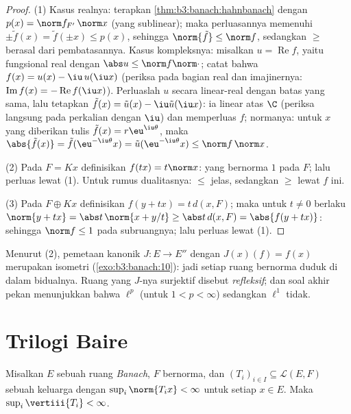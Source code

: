 \begin{proof}
(1) Kasus realnya: terapkan \cref{thm:b3:banach:hahnbanach} dengan $p(x)
= \norm f_{F'}\,\norm x$ (yang sublinear); maka perluasannya memenuhi
$\pm\tilde f(x) = \tilde f(\pm x) \leq p(x)$, sehingga
$\norm{\tilde f} \leq \norm f$, sedangkan $\geq$ berasal dari pembatasannya.
Kasus kompleksnya: misalkan $u = \operatorname{Re}f$, yaitu fungsional real
dengan $\abs u \leq \norm f\norm\cdot$; catat bahwa $f(x) = u(x) -
\iu\,u(\iu x)$ (periksa pada bagian real dan imajinernya:
$\operatorname{Im}f(x) = -\operatorname{Re}f(\iu x)$). Perluaslah
$u$ secara linear-real dengan batas yang sama, lalu tetapkan $\tilde f(x) =
\tilde u(x) - \iu\tilde u(\iu x)$: ia linear atas $\C$ (periksa langsung pada
perkalian dengan $\iu$) dan memperluas $f$; normanya: untuk $x$ yang diberikan
tulis $\tilde f(x) = r\eu^{\iu\theta}$, maka $\abs{\tilde f(x)}
= \tilde f(\eu^{-\iu\theta}x) = \tilde u(\eu^{-\iu\theta}x)
\leq \norm f\,\norm x$.

(2) Pada $F = Kx$ definisikan $f(tx) = t\norm x$: yang bernorma $1$ pada $F$;
lalu perluas lewat (1). Untuk rumus dualitasnya: $\leq$ jelas, sedangkan $\geq$ lewat
$f$ ini.

(3) Pada $F \oplus Kx$ definisikan $f(y + tx) = t\,d(x, F)$; maka untuk
$t \neq 0$ berlaku $\norm{y + tx} = \abs t\,\norm{x + y/t} \geq \abs
t\,d(x, F) = \abs{f(y + tx)}$: sehingga $\norm f \leq 1$ pada
subruangnya; lalu perluas lewat (1).
\end{proof}

\begin{remark}\label{rem:b3:banach:bidual}
Menurut (2), pemetaan kanonik $J \colon E \to E''$ dengan $J(x)(f) =
f(x)$ merupakan isometri (\cref{exo:b3:banach:10}): jadi setiap ruang
bernorma duduk di dalam bidualnya. Ruang yang $J$-nya surjektif
disebut \emph{refleksif}; dan soal akhir
pekan menunjukkan bahwa $\ell^p$ (untuk $1 < p < \infty$)  sedangkan
$\ell^1$ tidak.
\end{remark}

\section{Trilogi Baire}

\begin{theorem}
\label{thm:b3:banach:banachsteinhaus}
Misalkan $E$ sebuah ruang \emph{Banach}, $F$ bernorma, dan $(T_i)_{i\in
I} \subseteq \mathcal L(E, F)$ sebuah keluarga dengan $\sup_i
\norm{T_ix} < \infty$ untuk setiap $x \in E$. Maka $\sup_i
\vertiii{T_i} < \infty$.
\end{theorem}

